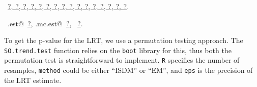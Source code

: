 \documentclass[reqno]{amsart}
\renewcommand{\NWlink}[2]{\hyperlink{#1}{#2}}
\begin{document}
\begin{flushleft}
\begin{list}{}{\setlength{\itemsep}{-\parsep}\setlength{\itemindent}{-\leftmargin}}
\item \NWtxtFileDefBy\ \NWlink{nuweb?}{?}\NWlink{nuweb?}{, ?}\NWlink{nuweb?}{, ?}\NWlink{nuweb?}{, ?}\NWlink{nuweb?}{, ?}\NWlink{nuweb?}{, ?}\NWlink{nuweb?}{, ?}\NWlink{nuweb?}{, ?}\NWlink{nuweb?}{, ?}\NWlink{nuweb?}{, ?}\NWlink{nuweb?}{, ?}\NWlink{nuweb?}{, ?}\NWlink{nuweb?}{, ?}\NWlink{nuweb?}{, ?}\NWlink{nuweb?}{, ?}\NWlink{nuweb?}{, ?}.
\item \NWtxtIdentsUsed\nobreak\  \verb@mc.est@\nobreak\ \NWlink{nuweb?}{?}, \verb@SO.mc.est@\nobreak\ \NWlink{nuweb?}{?}, \verb@soControl@\nobreak\ \NWlink{nuweb?}{?}.
\item{}
\end{list}
\vspace{4ex}
\end{flushleft}
To get the p-value for the LRT, we use a permutation testing approach. The \texttt{SO.trend.test} function
relies on the \texttt{boot} library for this, thus both the permutation test
is straightforward to implement. \texttt{R}
specifies the number of resamples, \texttt{method} could be either ``ISDM'' or 
``EM'', and \texttt{eps} is the precision of the LRT estimate.
\end{document}
